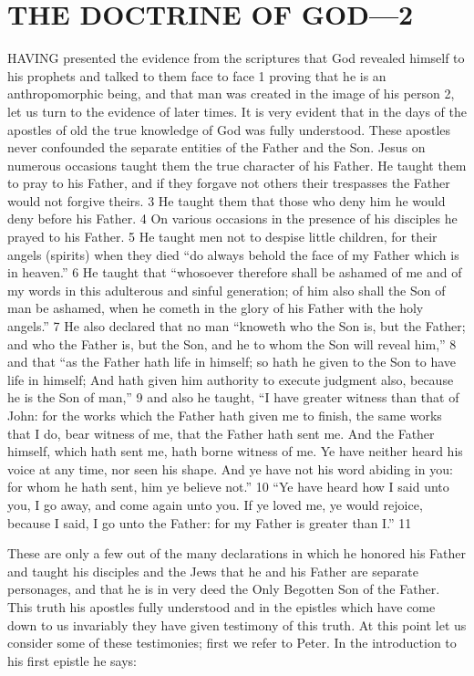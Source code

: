 \chapter{THE DOCTRINE OF GOD—2}

HAVING presented the evidence from the scriptures that God revealed himself to his
prophets and talked to them face to face 1 proving that he is an anthropomorphic being, and
that man was created in the image of his person 2, let us turn to the evidence of later times. It
is very evident that in the days of the apostles of old the true knowledge of God was fully
understood. These apostles never confounded the separate entities of the Father and the Son.
Jesus on numerous occasions taught them the true character of his Father. He taught them to
pray to his Father, and if they forgave not others their trespasses the Father would not forgive
theirs. 3 He taught them that those who deny him he would deny before his Father. 4 On
various occasions in the presence of his disciples he prayed to his Father. 5 He taught men
not to despise little children, for their angels (spirits) when they died ``do always behold the
face of my Father which is in heaven.'' 6 He taught that ``whosoever therefore shall be
ashamed of me and of my words in this adulterous and sinful generation; of him also shall
the Son of man be ashamed, when he cometh in the glory of his Father with the holy angels.''
7 He also declared that no man ``knoweth who the Son is, but the Father; and who the Father
is, but the Son, and he to whom the Son will reveal him,'' 8 and that ``as the Father hath life in
himself; so hath he given to the Son to have life in himself; And hath given him authority to
execute judgment also, because he is the Son of man,'' 9 and also he taught, ``I have greater
witness than that of John: for the works which the Father hath given me to finish, the same
works that I do, bear witness of me, that the Father hath sent me. And the Father himself,
which hath sent me, hath borne witness of me. Ye have neither heard his voice at any time,
nor seen his shape. And ye have not his word abiding in you: for whom he hath sent, him ye
believe not.'' 10 ``Ye have heard how I said unto you, I go away, and come again unto you. If
ye loved me, ye would rejoice, because I said, I go unto the Father: for my Father is greater
than I.'' 11

These are only a few out of the many declarations in which he honored his Father and taught
his disciples and the Jews that he and his Father are separate personages, and that he is in
very deed the Only Begotten Son of the Father. This truth his apostles fully understood and
in the epistles which have come down to us invariably they have given testimony of this
truth. At this point let us consider some of these testimonies; first we refer to Peter. In the
introduction to his first epistle he says:

